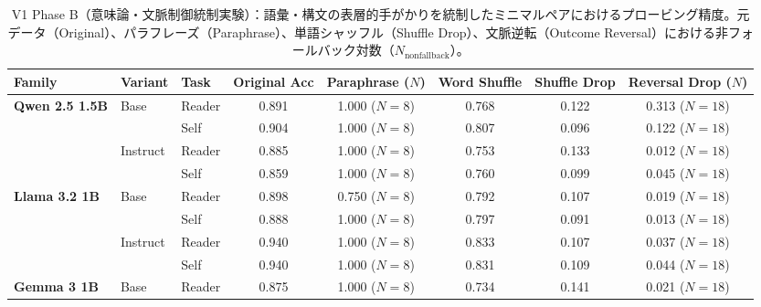 \begin{table}[htbp]
\centering
\small
\caption{V1 Phase B（意味論・文脈制御統制実験）：語彙・構文の表層的手がかりを統制したミニマルペアにおけるプロービング精度。元データ（Original）、パラフレーズ（Paraphrase）、単語シャッフル（Shuffle Drop）、文脈逆転（Outcome Reversal）における非フォールバック対数（$N_{\text{nonfallback}}$）。}
\label{tab:v1_semantic_controls}
\begin{tabular}{lll ccccc}
\toprule
\textbf{Family} & \textbf{Variant} & \textbf{Task} & \textbf{Original Acc} & \textbf{Paraphrase ($N$)} & \textbf{Word Shuffle} & \textbf{Shuffle Drop} & \textbf{Reversal Drop ($N$)} \\
\midrule
\multirow{4}{*}{\textbf{Qwen 2.5 1.5B}} & \multirow{2}{*}{Base} & Reader   & 0.891        & 1.000 ($N=8$)            & 0.768        & 0.122        & 0.313 ($N=18$)           \\
                                 &                    & Self     & 0.904        & 1.000 ($N=8$)            & 0.807        & 0.096        & 0.122 ($N=18$)           \\
\cmidrule(lr){2-8}
                                 & \multirow{2}{*}{Instruct} & Reader   & 0.885        & 1.000 ($N=8$)            & 0.753        & 0.133        & 0.012 ($N=18$)           \\
                                 &                    & Self     & 0.859        & 1.000 ($N=8$)            & 0.760        & 0.099        & 0.045 ($N=18$)           \\
\midrule
\multirow{4}{*}{\textbf{Llama 3.2 1B}} & \multirow{2}{*}{Base} & Reader   & 0.898        & 0.750 ($N=8$)            & 0.792        & 0.107        & 0.019 ($N=18$)           \\
                                 &                    & Self     & 0.888        & 1.000 ($N=8$)            & 0.797        & 0.091        & 0.013 ($N=18$)           \\
\cmidrule(lr){2-8}
                                 & \multirow{2}{*}{Instruct} & Reader   & 0.940        & 1.000 ($N=8$)            & 0.833        & 0.107        & 0.037 ($N=18$)           \\
                                 &                    & Self     & 0.940        & 1.000 ($N=8$)            & 0.831        & 0.109        & 0.044 ($N=18$)           \\
\midrule
\multirow{4}{*}{\textbf{Gemma 3 1B}} & \multirow{2}{*}{Base} & Reader   & 0.875        & 1.000 ($N=8$)            & 0.734        & 0.141        & 0.021 ($N=18$)           \\

\end{tabular}
\end{table}
